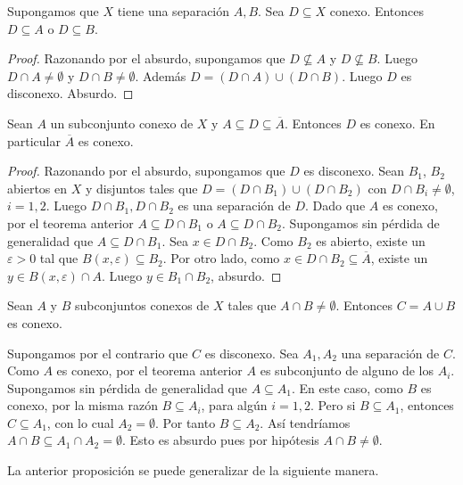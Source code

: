 \begin{teorema}
Supongamos que $X$ tiene una separación $A,B$. Sea $D\subseteq X$ conexo. Entonces $D\subseteq A$ o $D\subseteq B$.
\end{teorema}

\begin{proof}
Razonando por el absurdo, supongamos que $D \not \subseteq A$ y $D \not \subseteq B$. Luego $D\cap A \neq \emptyset$ y $D\cap B \neq \emptyset$. Además $D=(D\cap A)\cup (D\cap B)$. Luego $D$ es disconexo. Absurdo.
\end{proof}

\begin{corolario}
Sean $A$ un subconjunto conexo de $X$ y $A\subseteq D \subseteq \overline{A}.$ Entonces $D$ es conexo. En particular $\overline{A}$ es conexo.
\end{corolario}

\begin{proof}
Razonando por el absurdo, supongamos que $D$ es disconexo. Sean $B_1$, $B_2$ abiertos en $X$ y disjuntos tales que $D=(D\cap B_1)\cup (D\cap B_2)$ con $D\cap B_i \neq \emptyset$, $i=1,2$. Luego $D\cap B_1, D\cap B_2$ es una separación de $D$. Dado que $A$ es conexo, por el teorema anterior $A\subseteq D\cap B_1$ o $A\subseteq D\cap B_2$. Supongamos sin pérdida de generalidad que $A\subseteq D\cap B_1$. Sea $x\in D\cap B_2$. Como $B_2$ es abierto, existe un $\varepsilon>0$ tal que $B(x,\varepsilon)\subseteq B_2$. Por otro lado, como $x\in D\cap B_2\subseteq \overline{A}$, existe un $y\in B(x,\varepsilon)\cap A$. Luego $y\in B_1\cap B_2$, absurdo.
\end{proof}

\begin{afirmacion}
Sean $A$ y $B$  subconjuntos conexos de $X$ tales que $A \cap B \neq \emptyset$. Entonces $C=A\cup B $ es conexo.
\end{afirmacion}
\begin{prueba}
Supongamos por el contrario que $C$ es disconexo. Sea $A_1, A_2$ una separación de $C$.  Como $A$ es conexo, por el teorema anterior $A$ es subconjunto de alguno de los $A_i$. Supongamos sin pérdida de generalidad que $A\subseteq A_1$. En este caso, como $B$ es conexo, por la misma razón  $B \subseteq A_i$, para algún $i=1,2$. Pero si $B\subseteq A_1$, entonces $C\subseteq A_1$, con lo cual $A_2= \emptyset$. Por tanto $B \subseteq A_2.$ Así tendríamos $A\cap B \subseteq A_1 \cap A_2=\emptyset$. Esto es absurdo pues por hipótesis $A\cap B \neq \emptyset.$
\end{prueba}
La anterior proposición se puede generalizar de la siguiente manera.

